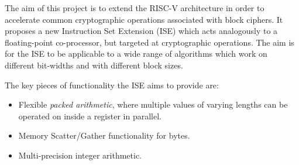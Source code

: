 

The aim of this project is to
extend the RISC-V architecture in order to accelerate common cryptographic
operations associated with block ciphers.
It proposes a new Instruction Set Extension (ISE)
which acts analogously to a floating-point co-processor,
but targeted at cryptographic operations.
The aim is for the ISE to be applicable to a wide range of algorithms
which work on different bit-widths and with different block sizes.

The key pieces of functionality the ISE aims to provide are:

\begin{itemize}
\item Flexible {\em packed arithmetic}, where multiple values of varying
    lengths can be operated on inside a register in parallel.
\item Memory Scatter/Gather functionality for bytes.
\item Multi-precision integer arithmetic.
\end{itemize}
